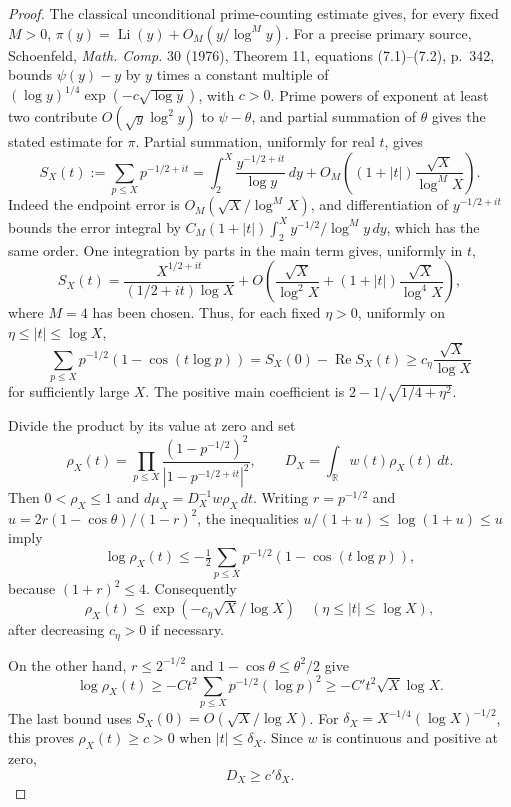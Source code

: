 \begin{proof}
The classical unconditional prime-counting estimate gives, for every
fixed \(M>0\),
\(\pi(y)=\operatorname{Li}(y)+O_M(y/\log^M y)\).
For a precise primary source, Schoenfeld, \emph{Math. Comp.} 30
(1976), Theorem 11, equations (7.1)--(7.2), p.~342, bounds
\(\psi(y)-y\) by \(y\) times a constant multiple of
\((\log y)^{1/4}\exp(-c\sqrt{\log y})\), with \(c>0\).
Prime powers of exponent at least two contribute
\(O(\sqrt y\log^2 y)\) to \(\psi-\theta\), and partial summation
of \(\theta\) gives the stated estimate for \(\pi\).
Partial summation, uniformly for real \(t\), gives
\[
 S_X(t):=\sum_{p\leq X}p^{-1/2+it}
 =\int_2^X\frac{y^{-1/2+it}}{\log y}\,dy
        +O_M\!\left((1+|t|)\frac{\sqrt X}{\log^M X}\right).
\]
Indeed the endpoint error is \(O_M(\sqrt X/\log^M X)\), and differentiation
of \(y^{-1/2+it}\) bounds the error integral by
\(C_M(1+|t|)\int_2^Xy^{-1/2}/\log^M y\,dy\), which has the
same order.
One integration by parts in the main term gives, uniformly in \(t\),
\[
 S_X(t)=\frac{X^{1/2+it}}{(1/2+it)\log X}
      +O\!\left(\frac{\sqrt X}{\log^2X}
             +(1+|t|)\frac{\sqrt X}{\log^4X}\right),
\]
where \(M=4\) has been chosen.
Thus, for each fixed \(\eta>0\), uniformly on
\(\eta\leq|t|\leq\log X\),
\[
 \sum_{p\leq X}p^{-1/2}(1-\cos(t\log p))
     =S_X(0)-\operatorname{Re}S_X(t)
     \geq c_\eta\frac{\sqrt X}{\log X}
\]
for sufficiently large \(X\).  The positive main coefficient is
\(2-1/\sqrt{1/4+\eta^2}\).

Divide the product by its value at zero and set
\[
 \rho_X(t)=\prod_{p\leq X}
       \frac{(1-p^{-1/2})^2}{|1-p^{-1/2+it}|^2},
 \qquad D_X=\int_{\mathbb R}w(t)\rho_X(t)\,dt.
\]
Then \(0<\rho_X\leq1\) and \(d\mu_X=D_X^{-1}w\rho_X\,dt\).
Writing \(r=p^{-1/2}\) and
\(u=2r(1-\cos\theta)/(1-r)^2\), the inequalities
\(u/(1+u)\leq\log(1+u)\leq u\) imply
\[
 \log\rho_X(t)
 \leq-\tfrac12\sum_{p\leq X}p^{-1/2}(1-\cos(t\log p)),
\]
because \((1+r)^2\leq4\).  Consequently
\[
 \rho_X(t)\leq\exp(-c_\eta\sqrt X/\log X)
        \quad(\eta\leq|t|\leq\log X),
\]
after decreasing \(c_\eta>0\) if necessary.

On the other hand, \(r\leq2^{-1/2}\) and
\(1-\cos\theta\leq\theta^2/2\) give
\[
 \log\rho_X(t)\geq
     -C t^2\sum_{p\leq X}p^{-1/2}(\log p)^2
     \geq-C' t^2\sqrt X\log X.
\]
The last bound uses \(S_X(0)=O(\sqrt X/\log X)\).
For \(\delta_X=X^{-1/4}(\log X)^{-1/2}\), this proves
\(\rho_X(t)\geq c>0\) when \(|t|\leq\delta_X\).
Since \(w\) is continuous and positive at zero,
\[
 D_X\geq c'\delta_X.
\]


\end{proof}

